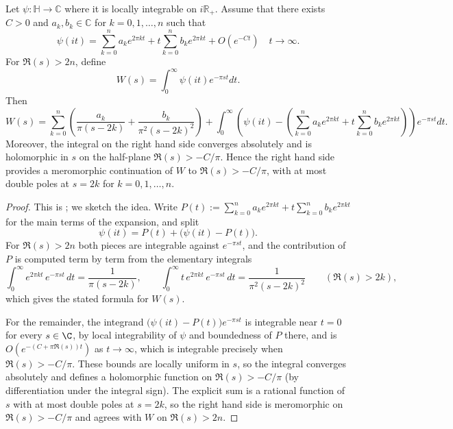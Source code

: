 \begin{proposition}\label{prop:laplace-continuation}
\leanok
    Let $\psi:\mathbb{H}\to\mathbb{C}$ where it is locally integrable on $i\mathbb{R}_+$.
    Assume that there exists $C>0$ and $a_k, b_k \in \mathbb{C}$ for $k = 0, 1, \dots, n$ such that
    \[
    \psi(it) = \sum_{k=0}^{n} a_k e^{2\pi k t} + t\sum_{k=0}^{n} b_k e^{2\pi k t} + O(e^{-Ct})\quad t\to\infty.
    \]
    For $\Re(s) > 2n$, define
    \[
    W(s) = \int_0^\infty \psi(it) e^{-\pi s t} dt.
    \]
    Then
    \[
    W(s) = \sum_{k=0}^{n}\left(\frac{a_k}{\pi(s-2k)} + \frac{b_k}{\pi^2(s-2k)^2}\right) + \int_0^\infty \left(\psi(it) - \left(\sum_{k=0}^{n} a_k e^{2\pi k t} + t\sum_{k=0}^{n} b_k e^{2\pi k t}\right)\right) e^{-\pi s t} dt.
    \]
    Moreover, the integral on the right hand side converges absolutely and is holomorphic in $s$ on the half-plane $\Re(s) > -C/\pi$.
    Hence the right hand side provides a meromorphic continuation of $W$ to $\Re(s) > -C/\pi$, with at most double poles at $s = 2k$ for $k = 0, 1, \dots, n$.
\end{proposition}
\begin{proof}\leanok
    This is \cite[Proposition~2.1]{FGH}; we sketch the idea.
    Write $P(t) := \sum_{k=0}^{n} a_k e^{2\pi k t} + t\sum_{k=0}^{n} b_k e^{2\pi k t}$ for the main terms of the expansion, and split
    \[
    \psi(it) = P(t) + \bigl(\psi(it) - P(t)\bigr).
    \]
    For $\Re(s) > 2n$ both pieces are integrable against $e^{-\pi s t}$, and the contribution of $P$ is computed term by term from the elementary integrals
    \[
    \int_0^\infty e^{2\pi k t}\, e^{-\pi s t}\, dt = \frac{1}{\pi(s - 2k)}, \qquad
    \int_0^\infty t\, e^{2\pi k t}\, e^{-\pi s t}\, dt = \frac{1}{\pi^2(s - 2k)^2} \qquad (\Re(s) > 2k),
    \]
    which gives the stated formula for $W(s)$.

    For the remainder, the integrand $\bigl(\psi(it) - P(t)\bigr) e^{-\pi s t}$ is integrable near $t = 0$ for every $s \in \C$, by local integrability of $\psi$ and boundedness of $P$ there, and is $O(e^{-(C + \pi \Re(s)) t})$ as $t \to \infty$, which is integrable precisely when $\Re(s) > -C/\pi$.
    These bounds are locally uniform in $s$, so the integral converges absolutely and defines a holomorphic function on $\Re(s) > -C/\pi$ (by differentiation under the integral sign).
    The explicit sum is a rational function of $s$ with at most double poles at $s = 2k$, so the right hand side is meromorphic on $\Re(s) > -C/\pi$ and agrees with $W$ on $\Re(s) > 2n$.
\end{proof}


